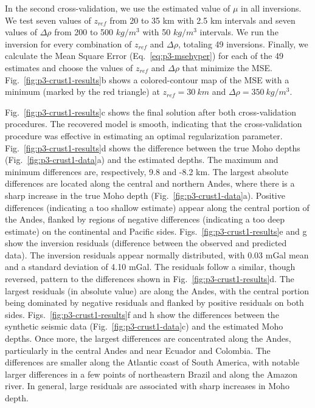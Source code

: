 In the second cross-validation,
we use the estimated value of $\mu$ in all inversions.
We test seven values of $z_{ref}$ from 20 to 35 km with 2.5 km intervals
and seven values of $\Delta\rho$ from 200 to 500 $kg/m^3$
with 50 $kg/m^3$ intervals.
We run the inversion for every combination of $z_{ref}$ and $\Delta\rho$,
totaling 49 inversions.
Finally, we calculate the Mean Square Error (Eq.~\ref{eq:p3-msehyper})
for each of the 49 estimates
and choose the values of $z_{ref}$ and $\Delta\rho$ that minimize the MSE.
Fig.~\ref{fig:p3-crust1-results}b
shows a colored-contour map of the MSE
with a minimum (marked by the red triangle)
at $z_{ref} = 30\ km$ and $\Delta\rho = 350\ kg/m^3$.

Fig.~\ref{fig:p3-crust1-results}c shows the final solution after both
cross-validation procedures.
The recovered model is smooth, indicating that the cross-validation procedure
was effective in estimating an optimal regularization parameter.
Fig.~\ref{fig:p3-crust1-results}d shows the difference between
the true Moho depths (Fig.~\ref{fig:p3-crust1-data}a)
and the estimated depths.
The maximum and minimum differences are, respectively,
9.8 and -8.2 km.
The largest absolute differences are located along the central and northern
Andes, where there is a sharp increase in the true Moho depth
(Fig.~\ref{fig:p3-crust1-data}a).
Positive differences (indicating a too shallow estimate)
appear along the central portion of the Andes,
flanked by regions of negative differences (indicating a too deep estimate)
on the continental and Pacific sides.
Figs.~\ref{fig:p3-crust1-results}e and g show the inversion residuals (difference
between the observed and predicted data).
The inversion residuals appear normally distributed,
with 0.03 mGal mean and a standard deviation of 4.10 mGal.
The residuals follow a similar, though reversed, pattern
to the differences shown in Fig.~\ref{fig:p3-crust1-results}d.
The largest residuals (in absolute value) are along the Andes,
with the central portion being dominated by negative residuals
and flanked by positive residuals on both sides.
Figs.~\ref{fig:p3-crust1-results}f and h show the differences between
the synthetic seismic data (Fig.~\ref{fig:p3-crust1-data}c)
and the estimated Moho depths.
Once more, the largest differences are concentrated along the Andes,
particularly in the central Andes and near Ecuador and Colombia.
The differences are smaller along the Atlantic coast of South America,
with notable larger differences in a few points of northeastern Brazil
and along the Amazon river.
In general, large residuals are associated with sharp increases in Moho depth.




